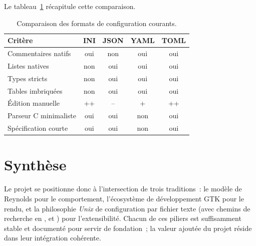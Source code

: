 Le tableau~\ref{tab:format-comparison} récapitule cette
comparaison.

\begin{table}[h!]
\centering
\footnotesize
\begin{tabular}{@{}lcccc@{}}
\toprule
\textbf{Critère} & \textbf{INI} & \textbf{JSON} & \textbf{YAML} & \textbf{TOML} \\
\midrule
Commentaires natifs    & oui & non & oui & oui \\
Listes natives         & non & oui & oui & oui \\
Types stricts          & non & oui & oui & oui \\
Tables imbriquées      & non & oui & oui & oui \\
Édition manuelle       & ++  & --  & +   & ++  \\
Parseur C minimaliste  & oui & oui & non & oui \\
Spécification courte   & oui & oui & non & oui \\
\bottomrule
\end{tabular}
\caption{Comparaison des formats de configuration courants.}
\label{tab:format-comparison}
\end{table}

\section{Synthèse}

Le projet se positionne donc à l'intersection de trois traditions~:
le modèle de Reynolds pour le comportement, l'écosystème de
développement GTK pour le rendu, et la philosophie \emph{Unix} de
configuration par fichier texte (avec chemins de recherche en
,  et ) pour
l'extensibilité. Chacun de ces piliers est suffisamment stable et
documenté pour servir de fondation~; la valeur ajoutée du projet
réside dans leur intégration cohérente.
